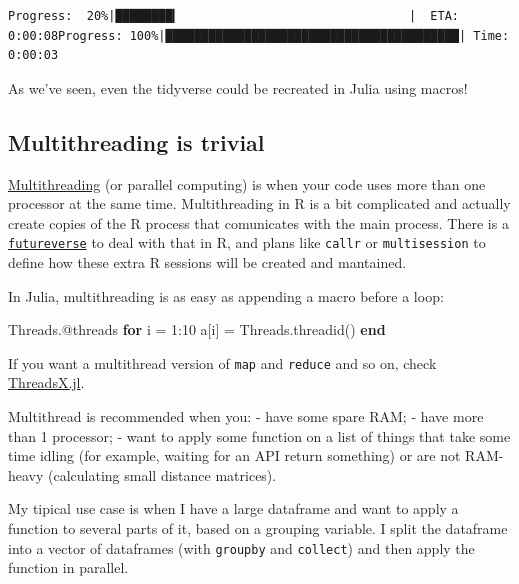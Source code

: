 \documentclass[
  letterpaper,
  DIV=11,
  numbers=noendperiod]{scrartcl}
\newenvironment{Shaded}{\begin{snugshade}}{\end{snugshade}}
\newcommand{\BuiltInTok}[1]{\textcolor[rgb]{0.00,0.23,0.31}{#1}}
\newcommand{\ControlFlowTok}[1]{\textcolor[rgb]{0.00,0.23,0.31}{\textbf{#1}}}
\newcommand{\FloatTok}[1]{\textcolor[rgb]{0.68,0.00,0.00}{#1}}
\newcommand{\FunctionTok}[1]{\textcolor[rgb]{0.28,0.35,0.67}{#1}}
\newcommand{\NormalTok}[1]{\textcolor[rgb]{0.00,0.23,0.31}{#1}}
\newcommand{\OperatorTok}[1]{\textcolor[rgb]{0.37,0.37,0.37}{#1}}
\newcommand{\PreprocessorTok}[1]{\textcolor[rgb]{0.68,0.00,0.00}{#1}}
\begin{document}
\begin{verbatim}
Progress:  20%|████████▎                                |  ETA: 0:00:08Progress: 100%|█████████████████████████████████████████| Time: 0:00:03
\end{verbatim}

As we've seen, even the tidyverse could be recreated in Julia using
macros!

\subsection{Multithreading is trivial}\label{multithreading-is-trivial}

\href{https://docs.julialang.org/en/v1/manual/multi-threading/}{Multithreading}
(or parallel computing) is when your code uses more than one processor
at the same time. Multithreading in R is a bit complicated and actually
create copies of the R process that comunicates with the main process.
There is a
\href{https://www.futureverse.org/packages-overview.html}{\texttt{futureverse}}
to deal with that in R, and plans like \texttt{callr} or
\texttt{multisession} to define how these extra R sessions will be
created and mantained.

In Julia, multithreading is as easy as appending a macro before a loop:

\begin{Shaded}
\begin{Highlighting}[]
\BuiltInTok{Threads}\NormalTok{.}\PreprocessorTok{@threads} \ControlFlowTok{for}\NormalTok{ i }\OperatorTok{=} \FloatTok{1}\OperatorTok{:}\FloatTok{10}
\NormalTok{    a[i] }\OperatorTok{=} \BuiltInTok{Threads}\NormalTok{.}\FunctionTok{threadid}\NormalTok{()}
\ControlFlowTok{end}
\end{Highlighting}
\end{Shaded}

If you want a multithread version of \texttt{map} and \texttt{reduce}
and so on, check \href{https://github.com/tkf/ThreadsX.jl}{ThreadsX.jl}.

Multithread is recommended when you: - have some spare RAM; - have more
than 1 processor; - want to apply some function on a list of things that
take some time idling (for example, waiting for an API return something)
or are not RAM-heavy (calculating small distance matrices).

My tipical use case is when I have a large dataframe and want to apply a
function to several parts of it, based on a grouping variable. I split
the dataframe into a vector of dataframes (with \texttt{groupby} and
\texttt{collect}) and then apply the function in parallel.
\end{document}
